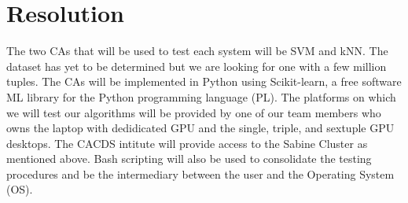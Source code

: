 \section*{Resolution}
\label{sec:Resolution}

The two CAs that will be used to test each system will be SVM and kNN. 
The dataset has yet to be determined but we are looking for one with a 
few million tuples. The CAs  will be implemented 
in Python using Scikit-learn, a free software ML library for the Python 
programming language (PL). The platforms on which we will test our 
algorithms will be provided by one of our team members who owns the 
laptop with dedidicated GPU and the single, triple, and sextuple GPU 
desktops. The CACDS intitute will provide access to the Sabine Cluster 
as mentioned above. Bash scripting will also be used to consolidate the 
testing procedures and be the intermediary between the user and the Operating System (OS).
